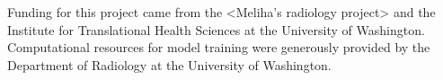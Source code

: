 \documentclass[../main.tex]{subfiles}
\begin{document}
Funding for this project came from the <Meliha's radiology project> and the Institute for Translational Health Sciences at the University of Washington. Computational resources for model training were generously provided by the Department of Radiology at the University of Washington.
\end{document}
